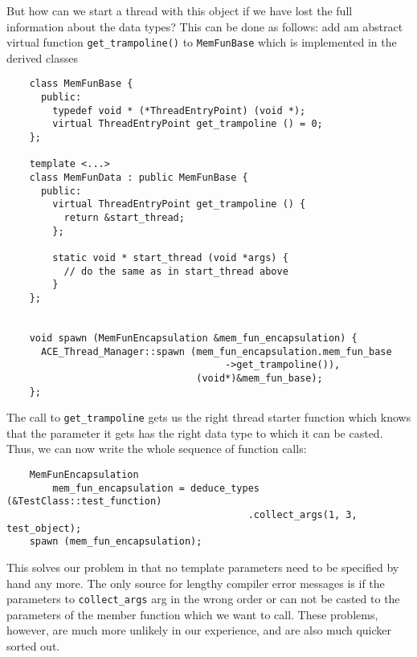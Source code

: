 \documentclass[11pt]{article}
\begin{document}
But how can we start a thread with this object if we have lost the full
information about the data types? This can be done as follows: add am abstract
virtual function \texttt{get\_trampoline()} to \texttt{MemFunBase} which is
implemented in the derived classes
\begin{verbatim}
    class MemFunBase {
      public:
        typedef void * (*ThreadEntryPoint) (void *);
        virtual ThreadEntryPoint get_trampoline () = 0;
    };

    template <...>
    class MemFunData : public MemFunBase {
      public:
        virtual ThreadEntryPoint get_trampoline () {
          return &start_thread;
        };

        static void * start_thread (void *args) {
          // do the same as in start_thread above
        }
    };


    void spawn (MemFunEncapsulation &mem_fun_encapsulation) {
      ACE_Thread_Manager::spawn (mem_fun_encapsulation.mem_fun_base
                                      ->get_trampoline()),
                                 (void*)&mem_fun_base);
    };
\end{verbatim}
The call to \texttt{get\_trampoline} gets us the right thread starter function
which knows that the parameter it gets has the right data type to which it can
be casted. Thus, we can now write the whole sequence of function calls:
\begin{verbatim}
    MemFunEncapsulation 
        mem_fun_encapsulation = deduce_types (&TestClass::test_function)
                                          .collect_args(1, 3, test_object);
    spawn (mem_fun_encapsulation);
\end{verbatim}
This solves our problem in that no template parameters need to be specified by
hand any more. The only source for lengthy compiler error messages is if the
parameters to \texttt{collect\_args} arg in the wrong order or can not be
casted to the parameters of the member function which we want to call. These
problems, however, are much more unlikely in our experience, and are also much
quicker sorted out.
\end{document}
